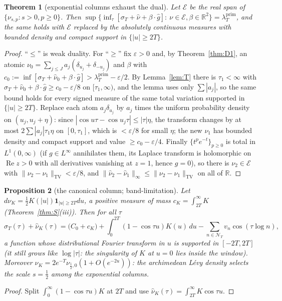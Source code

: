 \documentclass[11pt]{amsart}
\newtheorem{theorem}{Theorem}[section]
\newtheorem{proposition}[theorem]{Proposition}
\theoremstyle{definition}
\theoremstyle{remark}
\newcommand{\R}{\mathbb R}
\newcommand{\Rel}{\operatorname{Re}}
\newcommand{\TV}{\operatorname{TV}}
\newcommand{\lamP}{\lambda^{\mathrm{prim}}_T}
\newcommand{\sT}{\sigma_T}
\newcommand{\nuh}{\widehat\nu}
\newcommand{\NT}{\mathcal N_T}
\begin{document}
\begin{theorem}[exponential columns exhaust the dual]\label{thm:E}
Let $\mathcal E$ be the real span of $\{\nu_{s,p}:s>0,p\ge0\}$. Then
$\sup\{\inf_\tau[\sT+\nuh+\beta\cdot\widehat g]:\ \nu\in\mathcal E,\beta\in\R^2\}=\lamP$, and the same
holds with $\mathcal E$ replaced by the absolutely continuous measures with bounded density and
compact support in $\{|u|\ge2T\}$.
\end{theorem}
\begin{proof}
``$\le$'' is weak duality. For ``$\ge$'' fix $\varepsilon>0$ and, by Theorem~\ref{thm:D1}, an atomic
$\nu_0=\sum_{j\le J}a_j(\delta_{u_j}+\delta_{-u_j})$ and $\beta$ with
$c_0:=\inf[\sT+\nuh_0+\beta\cdot\widehat g]>\lamP-\varepsilon/2$. By Lemma~\ref{lem:T} there is
$\tau_1<\infty$ with $\sT+\nuh_0+\beta\cdot\widehat g\ge c_0-\varepsilon/8$ on $[\tau_1,\infty)$,
and the lemma uses only $\sum|a_j|$, so the same bound holds for every signed measure of the
same total variation supported in $\{|u|\ge2T\}$. Replace each atom $a_j\delta_{u_j}$ by
$a_j$ times the uniform probability density on $(u_j,u_j+\eta)$: since
$|\cos u\tau-\cos u_j\tau|\le|\tau|\eta$, the transform changes by at most $2\sum|a_j|\tau_1\eta$
on $[0,\tau_1]$, which is $<\varepsilon/8$ for small $\eta$; the new $\nu_1$ has bounded density
and compact support and value $\ge c_0-\varepsilon/4$. Finally $\{t^pe^{-t}\}_{p\ge0}$ is total in
$L^1(0,\infty)$ (if $g\in L^\infty$ annihilates them, its Laplace transform is holomorphic on
$\Rel z>0$ with all derivatives vanishing at $z=1$, hence $g=0$), so there is $\nu_2\in\mathcal E$
with $\|\nu_2-\nu_1\|_{\TV}<\varepsilon/8$, and $\|\nuh_2-\nuh_1\|_\infty\le\|\nu_2-\nu_1\|_{\TV}$ on all of $\R$.
\end{proof}

\begin{proposition}[the canonical column; band-limitation]\label{prop:M}
Let $d\nu_K=\frac12K(|u|)\mathbf 1_{|u|\ge2T}du$, a positive measure of mass
$c_K=\int_{2T}^\infty K$ (Theorem~\ref{thm:S}(iii)). Then for all $\tau$
\[
\sT(\tau)+\nuh_K(\tau)=\big(C_0+c_K\big)+\int_0^{2T}(1-\cos\tau u)K(u)\,du-\sum_{n\in\NT}v_n\cos(\tau\log n),
\]
a function whose distributional Fourier transform in $u$ is supported in $[-2T,2T]$ (it still grows
like $\log|\tau|$: the singularity of $K$ at $u=0$ lies inside the window). Moreover
$\nu_K=2e^{-T}\nu_{\frac12,0}(1+O(e^{-2u}))$:
the archimedean L\'evy density selects the scale $s=\frac12$ among the exponential columns.
\end{proposition}
\begin{proof}
Split $\int_0^\infty(1-\cos\tau u)K$ at $2T$ and use $\nuh_K(\tau)=\int_{2T}^\infty K\cos\tau u$.
\end{proof}
\end{document}
